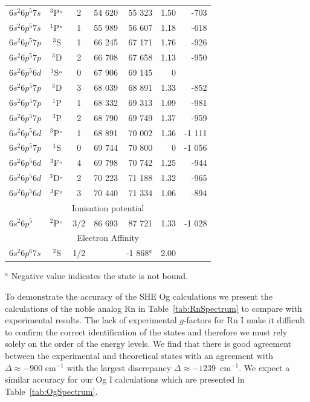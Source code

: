 \documentclass[10pt,a4paper, twoside, openright]{report}
\begin{document}
{\begin{longtable}{l@{\hspace{0.5cm}}cc@{\hspace{0.5cm}}r@{\hspace{0.5cm}}r@{\hspace{0.5cm}}r@{\hspace{0.5cm}}r@{\hspace{0.5cm}}}
$6s^2 6p^5 7s$ &    $^3$P$^{\rm_o}$         & 2  &  54 620  &  55 323     &  1.50     &  -703    \\
$6s^2 6p^5 7s$ &  $^1$P$^{\rm_o}$  & 1 &   55 989  & 56 607   &  1.18      &   -618    \\
$6s^2 6p^5 7p$ & $^3$S  &  1 &   66 245 & 67 171   & 1.76      &   -926     \\
$6s^2 6p^5 7p$ & $^3$D &  2 &   66 708 & 67 658  & 1.13     &   -950      \\
$6s^2 6p^5 6d$ & $^1$S$^{\rm_o}$ &   0 &  67 906  &   69 145  &  0          \\
$6s^2 6p^5 7p$ & $^3$D &  3 &   68 039  &  68 891  &  1.33      &   -852      \\
$6s^2 6p^5 7p$ & $^1$P & 1 &   68 332 &  69 313   & 1.09      & -981     \\
$6s^2 6p^5 7p$ & $^3$P &  2 &   68 790 &  69 749   & 1.37       &  -959    \\
$6s^2 6p^5 6d$ & $^3$P$^{\rm_o}$ &  1 &  68 891  & 70 002     &   1.36    & -1 111  \\
$6s^2 6p^5 7p$ & $^1$S &  0 &   69 744    &   70 800    &   0    &   -1 056      \\
$6s^2 6p^5 6d$ & $^3$F$^{\rm_o}$ &  4 &    69 798   &   70 742     &  1.25    &  -944   \\
$6s^2 6p^5 6d$ &  $^3$D$^{\rm_o}$ &  2     &   70 223   &  71 188 &   1.32    &   -965  \\
$6s^2 6p^5 6d$ & $^3$F$^{\rm_o}$ &  3 & 70 440  &  71 334 &  1.06     &    -894       \\
\multicolumn{7}{c}{Ionisation potential} \\
$6s^2 6p^5$ & $^2$P$^{\rm_o}$ & $3/2$ & 86 693 & 87 721 & 1.33 & -1 028   \\
\multicolumn{7}{c}{Electron Affinity} \\
$6s^2 6p^6 7s$ &   $^2$S & 1/2 &  & -1 868$^{a}$ & 2.00 &    \\
\bottomrule
\bottomrule
\end{longtable}
\begin{flushleft}
$^a$ Negative value indicates the state is not bound.
\end{flushleft}
}
To demonstrate the accuracy of the SHE Og calculations we present the calculations of the noble analog Rn in Table~\ref{tab:RnSpectrum} to compare with experimental results. The lack of experimental $g$-factors for Rn I make it difficult to confirm the correct identification of the states and therefore we must rely solely on the order of the energy levels. We find that there is good agreement between the experimental and theoretical states with an agreement with  $\Delta \approx -900$ cm$^{-1}$ with the largest discrepancy   $\Delta \approx -1239 $~cm$^{-1}$. We expect a similar accuracy for our Og I calculations which are presented in Table~\ref{tab:OgSpectrum}. \\
\end{document}
